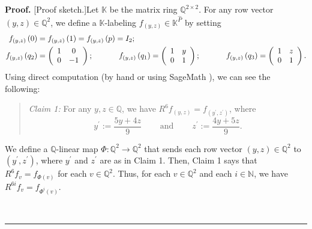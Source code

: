 \documentclass[numbers=enddot,12pt,final,onecolumn,notitlepage]{scrartcl}%
\theoremstyle{definition}
\newenvironment{verlong}{}{}
\newenvironment{statement}{\begin{quote}}{\end{quote}}
\newenvironment{proof}[1][Proof]{\noindent\textbf{#1.} }{\ \rule{0.5em}{0.5em}}
\begin{document}
\begin{verlong}
\begin{proof}
[Proof sketch.]Let $\mathbb{K}$ be the matrix ring $\mathbb{Q}^{2\times2}$.
For any row vector $\left(  y,z\right)  \in\mathbb{Q}^{2}$, we define a
$\mathbb{K}$-labeling $f_{\left(  y,z\right)  }\in\mathbb{K}^{\widehat{P}}$ by
setting%
\begin{align*}
f_{\left(  y,z\right)  }\left(  0\right)   &  =f_{\left(  y,z\right)  }\left(
1\right)  =f_{\left(  y,z\right)  }\left(  p\right)  =I_{2};\\
f_{\left(  y,z\right)  }\left(  q_{2}\right)   &  =\left(
\begin{array}
[c]{cc}%
1 & 0\\
0 & -1
\end{array}
\right)  ;\ \ \ \ \ \ \ \ \ \ f_{\left(  y,z\right)  }\left(  q_{1}\right)
=\left(
\begin{array}
[c]{cc}%
1 & y\\
0 & 1
\end{array}
\right)  ;\ \ \ \ \ \ \ \ \ \ f_{\left(  y,z\right)  }\left(  q_{3}\right)
=\left(
\begin{array}
[c]{cc}%
1 & z\\
0 & 1
\end{array}
\right)  .
\end{align*}
Using direct computation (by hand or using SageMath \cite{sage}), we can see
the following:

\begin{statement}
\textit{Claim 1:} For any $y,z\in\mathbb{Q}$, we have $R^{6}f_{\left(
y,z\right)  }=f_{\left(  y^{\prime},z^{\prime}\right)  }$, where%
\[
y^{\prime}:=\dfrac{5y+4z}{9}\ \ \ \ \ \ \ \ \ \ \text{and}%
\ \ \ \ \ \ \ \ \ \ z^{\prime}:=\dfrac{4y+5z}{9}.
\]

\end{statement}

We define a $\mathbb{Q}$-linear map $\Phi:\mathbb{Q}^{2}\rightarrow
\mathbb{Q}^{2}$ that sends each row vector $\left(  y,z\right)  \in
\mathbb{Q}^{2}$ to $\left(  y^{\prime},z^{\prime}\right)  $, where $y^{\prime
}$ and $z^{\prime}$ are as in Claim 1. Then, Claim 1 says that $R^{6}%
f_{v}=f_{\Phi\left(  v\right)  }$ for each $v\in\mathbb{Q}^{2}$. Thus, for
each $v\in\mathbb{Q}^{2}$ and each $i\in\mathbb{N}$, we have $R^{6i}%
f_{v}=f_{\Phi^{i}\left(  v\right)  }$.


\end{proof}
\end{verlong}
\end{document}
